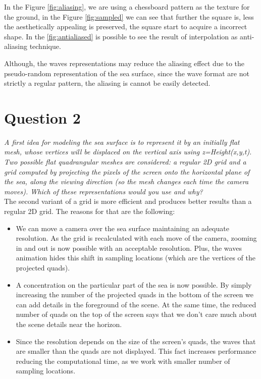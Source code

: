 \documentclass{report}
\begin{document}
In the Figure \ref{fig:aliasing}, we are using a chessboard pattern as the texture for the ground, in the Figure \ref{fig:sampled} we can see that further the square is, less the aesthetically appealing is preserved, the square start to acquire a incorrect shape. In the \ref{fig:antialiased} is possible to see the result of interpolation as anti-aliasing technique.	

Although, the waves representations may reduce the aliasing effect due to the pseudo-random representation of the sea surface, since the wave format are not strictly a regular pattern, the aliasing is cannot be easily detected. 


\section{Question 2}

\emph{A first idea for modeling the sea surface is to represent it by an
initially flat mesh, whose vertices will be displaced on the vertical
axis using z=Height(x,y,t). Two possible flat quadrangular meshes are
considered: a regular 2D grid and a grid computed by projecting the
pixels of the screen onto the horizontal plane of the sea, along the
viewing direction (so the mesh changes each time the camera moves).
Which of these representations would you use and why?}\\

The second variant of a grid is more efficient and produces better
results than a regular 2D grid. The reasons for that are the following:

\begin{itemize}

  \item We can move a camera over the sea surface maintaining an
    adequate resolution. As the grid is recalculated with each move of
    the camera, zooming in and out is now possible with an acceptable
    resolution. Plus, the waves animation hides this shift in sampling
    locations (which are the vertices of the projected quads).

  \item A concentration on the particular part of the sea is now
    possible. By simply increasing the number of the projected quads in
    the bottom of the screen we can add details in the foreground of the
    scene. At the same time, the reduced number of quads on the top of
    the screen says that we don't care much about the scene details
    near the horizon.

  \item Since the resolution depends on the size of the screen's quads,
    the waves that are smaller than the quads are not displayed. This
    fact increases performance reducing the computational time, as we
    work with smaller number of sampling locations.

\end{itemize}
\end{document}
